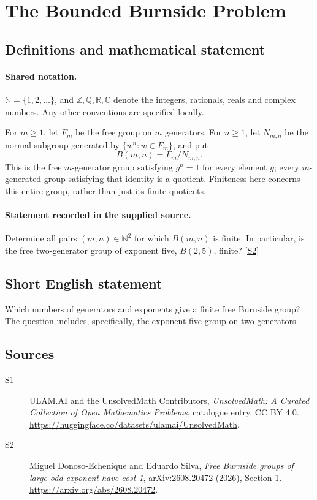 \documentclass[11pt]{article}
\newcommand{\sref}[2]{\hyperlink{source:#1:#2}{[S#2]}}
\begin{document}
\section{The Bounded Burnside Problem}\label{statement}

\subsection{Definitions and mathematical statement}

\paragraph{Shared notation.}$\mathbb N=\{1,2,\ldots\}$, and $\mathbb Z,\mathbb Q,\mathbb R,\mathbb C$ denote the integers, rationals, reals and complex numbers. Any other conventions are specified locally.


For \(m\ge1\), let \(F_m\) be the free group on \(m\) generators.
For \(n\ge1\), let \(N_{m,n}\) be the normal subgroup generated by
\(\{w^n:w\in F_m\}\), and put
\[
 B(m,n)=F_m/N_{m,n}.
\]
This is the free \(m\)-generator group satisfying \(g^n=1\) for every
element \(g\); every \(m\)-generated group satisfying that identity is a quotient.
Finiteness here concerns this entire group, rather than just its finite quotients.
\paragraph{Statement recorded in the supplied source.}
Determine all pairs \((m,n)\in\mathbb N^2\) for which
\(B(m,n)\) is finite.  In particular, is the free two-generator
group of exponent five, \(B(2,5)\), finite? \sref{statement}{2}
\subsection{Short English statement}
Which numbers of generators and exponents give a finite free Burnside group? The question includes, specifically, the exponent-five group on two generators.
\subsection{Sources}
\begin{description}
\item[\hypertarget{source:statement:1}{S1}] ULAM.AI and the UnsolvedMath Contributors, \emph{UnsolvedMath: A Curated Collection of Open Mathematics Problems}, catalogue entry. CC BY 4.0. \url{https://huggingface.co/datasets/ulamai/UnsolvedMath}.
\item[\hypertarget{source:statement:2}{S2}] Miguel Donoso-Echenique and Eduardo Silva, \emph{Free Burnside groups of large odd exponent have cost 1}, arXiv:2608.20472 (2026), Section 1. \url{https://arxiv.org/abs/2608.20472}.
\end{description}
\label{end:statement}
\end{document}
